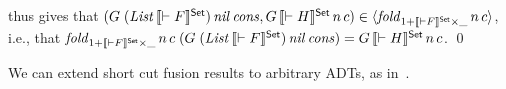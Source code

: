 \documentclass{lmcs}
\theoremstyle{plain}\newtheorem{satz}[thm]{Satz}
\begin{document}
thus gives that $(G \;(\mathit{List}\,\llbracket{\vdash
  F}\rrbracket^{\mathsf{Set}})\,\mathit{nil} \,\mathit{cons}, G \,\llbracket{\vdash H}\rrbracket^{\mathsf{Set}} \,
n\, c) \in \langle {\mathit{fold}_{1 + \llbracket{\vdash F}\rrbracket^{\mathsf{Set}} \times \_}\, n\, c} \rangle$, i.e.,
that $\mathit{fold}_{1 + \llbracket{\vdash F}\rrbracket^{\mathsf{Set}} \times \_}\, n\, c\; (G\;
(\mathit{List}\,\llbracket{\vdash F}\rrbracket^{\mathsf{Set}})\, \mathit{nil}\, \mathit{cons})
= G \,\llbracket{\vdash H}\rrbracket^{\mathsf{Set}}\, n\, c$.
\qed

We can extend short cut fusion results to arbitrary ADTs, as
in~\cite{joh02,pit98}.
\end{document}
